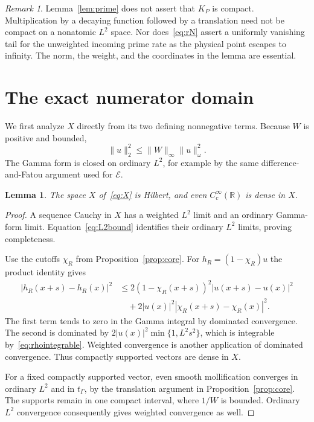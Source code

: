 \documentclass[11pt,a4paper]{article}
\numberwithin{equation}{section}
\newtheorem{lemma}[theorem]{Lemma}
\theoremstyle{remark}
\newtheorem{remark}[theorem]{Remark}
\newcommand{\R}{\mathbb R}
\newcommand{\E}{\mathcal E}
\newcommand{\tg}{t_{\Gamma}}
\newcommand{\norm}[1]{\lVert #1\rVert}
\begin{document}
\begin{remark}
Lemma~\ref{lem:prime} does not assert that $K_P$ is compact. Multiplication by a decaying function followed by a translation need not be compact on a nonatomic $L^2$ space. Nor does~\eqref{eq:rN} assert a uniformly vanishing tail for the unweighted incoming prime rate as the physical point escapes to infinity. The norm, the weight, and the coordinates in the lemma are essential.
\end{remark}

\section{The exact numerator domain}\label{sec:domain}

We first analyze $X$ directly from its two defining nonnegative terms. Because $W$ is positive and bounded,
\begin{equation}\label{eq:L2bound}
 \norm{u}_2^2\le\norm{W}_\infty\norm{u}_\omega^2.
\end{equation}
The Gamma form is closed on ordinary $L^2$, for example by the same difference-and-Fatou argument used for $\E$.

\begin{lemma}\label{lem:Xcore}
The space $X$ of~\eqref{eq:X} is Hilbert, and even $C_c^\infty(\R)$ is dense in $X$.
\end{lemma}
\begin{proof}
A sequence Cauchy in $X$ has a weighted $L^2$ limit and an ordinary Gamma-form limit. Equation~\eqref{eq:L2bound} identifies their ordinary $L^2$ limits, proving completeness.

Use the cutoffs $\chi_R$ from Proposition~\ref{prop:core}. For $h_R=(1-\chi_R)u$ the product identity gives
\begin{align*}
 |h_R(x+s)-h_R(x)|^2
 &\le2(1-\chi_R(x+s))^2|u(x+s)-u(x)|^2\\
 &\quad+2|u(x)|^2|\chi_R(x+s)-\chi_R(x)|^2.
\end{align*}
The first term tends to zero in the Gamma integral by dominated convergence. The second is dominated by
$2|u(x)|^2\min\{1,L^2s^2\}$, which is integrable by~\eqref{eq:rhointegrable}. Weighted convergence is another application of dominated convergence. Thus compactly supported vectors are dense in $X$.

For a fixed compactly supported vector, even smooth mollification converges in ordinary $L^2$ and in $\tg$, by the translation argument in Proposition~\ref{prop:core}. The supports remain in one compact interval, where $1/W$ is bounded. Ordinary $L^2$ convergence consequently gives weighted convergence as well.
\end{proof}
\end{document}
